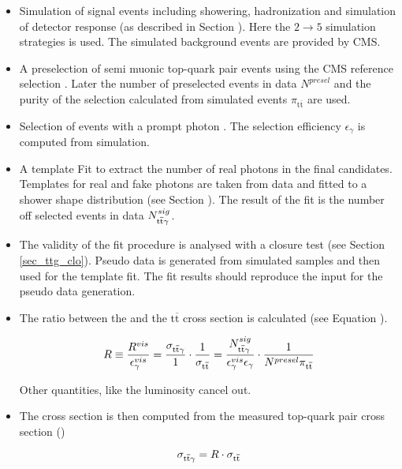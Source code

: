 \begin{itemize}
\item Simulation of \ttgamma signal events including showering, hadronization and simulation of detector response (as described in Section ). Here the $2 \to 5$ simulation strategies is used. The simulated background events are provided by CMS.
\item A preselection of semi muonic top-quark pair events using the CMS reference selection . Later the number of preselected events in data $N^{presel}$ and the purity of the selection calculated from simulated events $\pi_{\mathrm{t}\overline{\mathrm{t}}}$ are used.
\item Selection of events with a prompt photon . The selection efficiency $\epsilon_{\gamma}$ is computed from simulation.
\item A template Fit to extract the number of real photons in the final candidates. Templates for real and fake photons are taken from data and fitted to a shower shape distribution (see Section ). The result of the fit is the number off selected \ttgamma events in data $N^{sig}_{\mathrm{t}\overline{\mathrm{t}} \gamma}$.
\item The validity of the fit procedure is analysed with a closure test (see Section \ref{sec_ttg_clo}). Pseudo data is generated from simulated samples and then used for the template fit. The fit results should reproduce the input for the pseudo data generation.
\item The ratio between the \ttgamma and the $\mathrm{t}\overline{\mathrm{t}}$ cross section is calculated (see Equation ).

\begin{equation}
R \equiv \frac{R^{vis}}{\epsilon^{vis}_{\gamma}} = \frac{\sigma_{\mathrm{t}\overline{\mathrm{t}} \gamma}}{1} \cdot \frac{1}{\sigma_{\mathrm{t}\overline{\mathrm{t}}}} = \frac{N^{sig}_{\mathrm{t}\overline{\mathrm{t}} \gamma}}{\epsilon^{vis}_{\gamma} \epsilon_{\gamma}} \cdot \frac{1}{N^{presel} \pi_{\mathrm{t}\overline{\mathrm{t}}}}
\end{equation}

Other quantities, like the luminosity cancel out.
\item The \ttgamma cross section is then computed from the measured top-quark pair cross section ()

\begin{equation}
\sigma_{\mathrm{t}\overline{\mathrm{t}} \gamma} = R \cdot \sigma_{\mathrm{t}\overline{\mathrm{t}}}
\end{equation}

\end{itemize}

